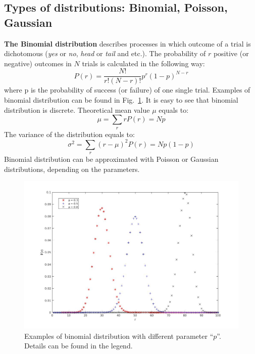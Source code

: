 \documentclass[12pt,a4paper]{report}
\begin{document}
\subsection{Types of distributions: Binomial, Poisson, Gaussian} 
\textbf{The Binomial distribution} describes processes in which outcome of a trial is dichotomous (\textit{yes} or \textit{no}, \textit{head} or \textit{tail} and etc.). The probability of $r$ positive (or negative) outcomes in $N$ trials is calculated in the following way:
\begin{equation*}
P(r) = \frac{N!}{r! (N-r)!}p^r (1-p)^{N-r}
\end{equation*}
where p is the probability of success (or failure) of one single trial. Examples of binomial distribution can be found in Fig.~\ref{fig:Binom}. It is easy to see that binomial distribution is discrete. Theoretical mean value $\mu$ equals to:
\begin{equation} \label{binom_mean_val}
\mu = \sum_r r P(r) = Np
\end{equation}
The variance of the distribution equals to:
\begin{equation*}
\sigma^2 = \sum_r (r-\mu)^2P(r) = Np(1-p)
\end{equation*}
Binomial distribution can be approximated with Poisson or Gaussian distributions, depending on the parameters. 
\begin{figure}[!h]
\begin{center}
\includegraphics*[scale = 0.5]{Figures/Binom}
\caption{\label{fig:Binom} Examples of binomial distribution with different parameter \enquote{$p$}. Details can be found in the legend.}
\end{center}
\end{figure}
\end{document}
